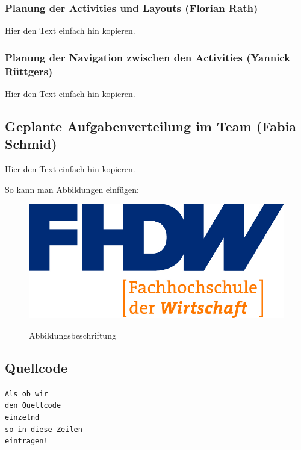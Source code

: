 \newpage

\subsubsection{Planung der Activities und Layouts (Florian Rath)}

Hier den Text einfach hin kopieren.

\subsubsection{Planung der Navigation zwischen den Activities (Yannick Rüttgers)}

Hier den Text einfach hin kopieren.

\subsection{Geplante Aufgabenverteilung im Team (Fabia Schmid)}

Hier den Text einfach hin kopieren.


So kann man Abbildungen einfügen:

\begin{figure}[H]
\centering
\begin{minipage}[t]{1\textwidth} %
\caption{Abbildungsbeschriftung} %
\includegraphics[width=1\textwidth]{img/fhdw}\\ %
\end{minipage}
\end{figure}

\subsection{Quellcode}

\texttt{Als ob wir}\\
\texttt{den Quellcode}\\
\texttt{einzelnd}\\
\texttt{so in diese Zeilen}\\
\texttt{eintragen!}\\
